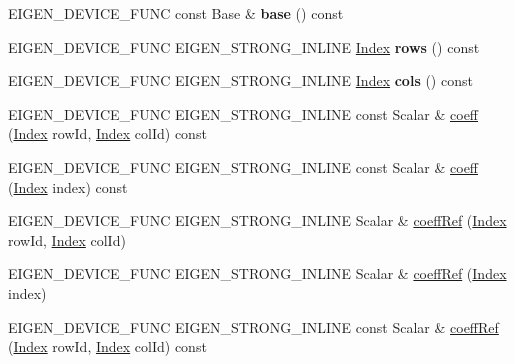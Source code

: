\begin{DoxyCompactItemize}
E\+I\+G\+E\+N\+\_\+\+D\+E\+V\+I\+C\+E\+\_\+\+F\+U\+NC const Base \& {\bfseries base} () const
\item 
\mbox{\label{class_eigen_1_1_plain_object_base_aba7a925ce36c08ba2a08c90086f34718}} 
E\+I\+G\+E\+N\+\_\+\+D\+E\+V\+I\+C\+E\+\_\+\+F\+U\+NC E\+I\+G\+E\+N\+\_\+\+S\+T\+R\+O\+N\+G\+\_\+\+I\+N\+L\+I\+NE \hyperlink{namespace_eigen_a62e77e0933482dafde8fe197d9a2cfde}{Index} {\bfseries rows} () const
\item 
\mbox{\label{class_eigen_1_1_plain_object_base_a10b8b33b7587da564415561aa246f78f}} 
E\+I\+G\+E\+N\+\_\+\+D\+E\+V\+I\+C\+E\+\_\+\+F\+U\+NC E\+I\+G\+E\+N\+\_\+\+S\+T\+R\+O\+N\+G\+\_\+\+I\+N\+L\+I\+NE \hyperlink{namespace_eigen_a62e77e0933482dafde8fe197d9a2cfde}{Index} {\bfseries cols} () const
\item 
E\+I\+G\+E\+N\+\_\+\+D\+E\+V\+I\+C\+E\+\_\+\+F\+U\+NC E\+I\+G\+E\+N\+\_\+\+S\+T\+R\+O\+N\+G\+\_\+\+I\+N\+L\+I\+NE const Scalar \& \hyperlink{class_eigen_1_1_plain_object_base_afbfc12954f16d21aedb7bd839f64a278}{coeff} (\hyperlink{namespace_eigen_a62e77e0933482dafde8fe197d9a2cfde}{Index} row\+Id, \hyperlink{namespace_eigen_a62e77e0933482dafde8fe197d9a2cfde}{Index} col\+Id) const
\item 
E\+I\+G\+E\+N\+\_\+\+D\+E\+V\+I\+C\+E\+\_\+\+F\+U\+NC E\+I\+G\+E\+N\+\_\+\+S\+T\+R\+O\+N\+G\+\_\+\+I\+N\+L\+I\+NE const Scalar \& \hyperlink{class_eigen_1_1_plain_object_base_af592e3993ea3d4ac9f073b42db2c04cc}{coeff} (\hyperlink{namespace_eigen_a62e77e0933482dafde8fe197d9a2cfde}{Index} index) const
\item 
E\+I\+G\+E\+N\+\_\+\+D\+E\+V\+I\+C\+E\+\_\+\+F\+U\+NC E\+I\+G\+E\+N\+\_\+\+S\+T\+R\+O\+N\+G\+\_\+\+I\+N\+L\+I\+NE Scalar \& \hyperlink{class_eigen_1_1_plain_object_base_a25626a55b26a4323565f79d1b7c48ea8}{coeff\+Ref} (\hyperlink{namespace_eigen_a62e77e0933482dafde8fe197d9a2cfde}{Index} row\+Id, \hyperlink{namespace_eigen_a62e77e0933482dafde8fe197d9a2cfde}{Index} col\+Id)
\item 
E\+I\+G\+E\+N\+\_\+\+D\+E\+V\+I\+C\+E\+\_\+\+F\+U\+NC E\+I\+G\+E\+N\+\_\+\+S\+T\+R\+O\+N\+G\+\_\+\+I\+N\+L\+I\+NE Scalar \& \hyperlink{class_eigen_1_1_plain_object_base_a571632ed666076d7403c8bd3eece44f0}{coeff\+Ref} (\hyperlink{namespace_eigen_a62e77e0933482dafde8fe197d9a2cfde}{Index} index)
\item 
E\+I\+G\+E\+N\+\_\+\+D\+E\+V\+I\+C\+E\+\_\+\+F\+U\+NC E\+I\+G\+E\+N\+\_\+\+S\+T\+R\+O\+N\+G\+\_\+\+I\+N\+L\+I\+NE const Scalar \& \hyperlink{class_eigen_1_1_plain_object_base_ab1b33ee10e4c72ec5cf354d511900e62}{coeff\+Ref} (\hyperlink{namespace_eigen_a62e77e0933482dafde8fe197d9a2cfde}{Index} row\+Id, \hyperlink{namespace_eigen_a62e77e0933482dafde8fe197d9a2cfde}{Index} col\+Id) const

\end{DoxyCompactItemize}

